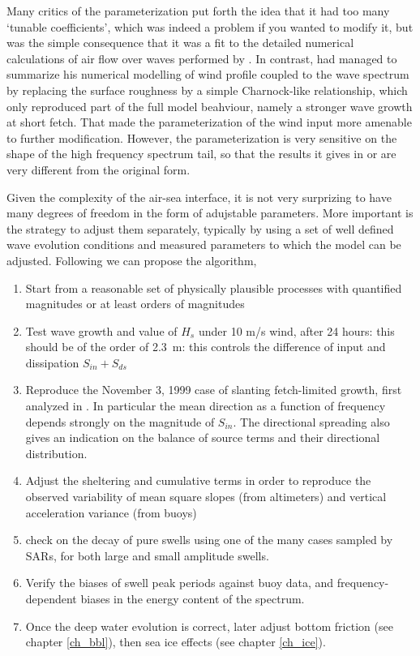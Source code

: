 Many critics of the \cite{Tolman&Chalikov1996} parameterization put forth the idea that it had too many `tunable coefficients', which 
was indeed a problem if you wanted to modify it, but was the simple consequence that it was a fit to the detailed numerical calculations 
of air flow over waves performed by \cite{Chalikov1993}.  In contrast, \cite{Janssen1991} had managed to summarize his 
numerical modelling of wind profile coupled to the wave spectrum by replacing the surface roughness by a simple Charnock-like 
relationship, which only reproduced part of the full model beahviour, namely a stronger wave growth at short fetch. 
That made the \cite{Janssen1991} parameterization of the wind input more amenable to further modification. However, the \cite{Janssen1991} parameterization
is very sensitive on the shape of the high frequency spectrum tail, so that 
the results it gives in \cite{Banner&Morison2006} or \cite{Ardhuin&al.2010} are very different from the original form. 

Given the complexity of the air-sea interface, it is not very surprizing to have many degrees of freedom in the form
of adujstable parameters. More important is the strategy to adjust them separately, typically by using a set of well defined 
wave evolution conditions and measured parameters to which the model can be adjusted. Following  \cite{Ardhuin&al.2010} we can propose the algorithm, 
\begin{enumerate}
 \item Start from a reasonable set of physically plausible processes with quantified magnitudes or at least orders of magnitudes
 \item Test wave growth and value of $H_s$ under 10 m/s wind, after 24 hours: this should be of the order of 2.3~m: this controls the difference 
 of input and dissipation $S_{in}+S_{ds}$
 \item Reproduce the November 3, 1999 case of slanting fetch-limited growth, first analyzed in \cite{Ardhuin&al.2007}. In particular the mean direction 
 as a function of frequency depends strongly on the magnitude of $S_{in}$. The directional spreading also gives an indication on the balance of source 
 terms and their directional distribution.
 \item Adjust the sheltering and cumulative terms in order to reproduce the observed variability of mean square slopes (from altimeters) and 
 vertical acceleration variance (from buoys) 
 \item check on the decay of pure swells using one of the many cases sampled by SARs, for both large and small amplitude swells.
 \item Verify the biases of swell peak periods against buoy data, and frequency-dependent biases in the energy content of the spectrum.
 \item Once the deep water evolution is correct, later adjust bottom friction (see chapter \ref{ch_bbl}), then sea ice effects (see chapter \ref{ch_ice}). 
\end{enumerate}


